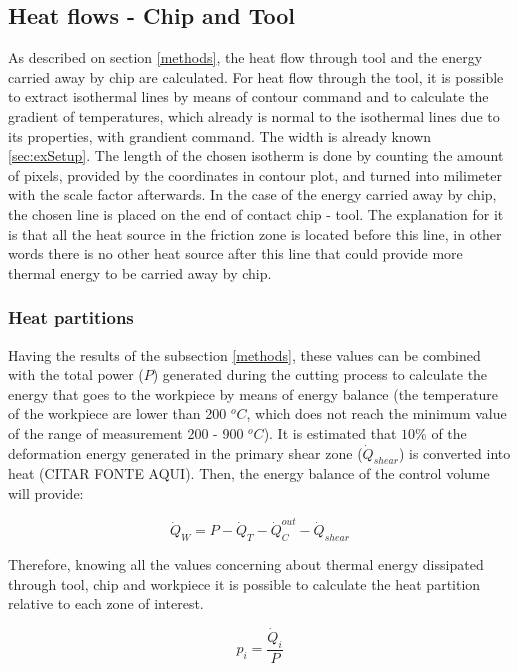 	\subsection{Heat flows - Chip and Tool}
	\label{heatflows}
	As described on section \ref{methods}, the heat flow through tool and the energy carried away by chip are calculated. For heat flow through the tool, it is possible to extract isothermal lines by means of contour command and to calculate the gradient of temperatures, which already is normal to the isothermal lines due to its properties, with grandient command. The width is already known \ref{sec:exSetup}. The length of the chosen isotherm is done by counting the amount of pixels, provided by the coordinates in contour plot, and turned into milimeter with the scale factor afterwards.
	In the case of the energy carried away by chip, the chosen line is placed on the end of contact chip - tool. The explanation for it is that all the heat source in the friction zone is located before this line, in other words there is no other heat source after this line that could provide more thermal energy to be carried away by chip.		

		\subsubsection{Heat partitions}
		Having the results of the subsection \ref{methods}, these values can be combined with the total power ($P$) generated during the cutting process to calculate the energy that goes to the workpiece by means of energy balance (the temperature of the workpiece are lower than 200 $^{o}C$, which does not reach the minimum value of the range of measurement 200 - 900 $^{o}C$).
		It is estimated that $10\%$ of the deformation energy generated in the primary shear zone ($\dot{Q}_{shear}$) is converted into heat (CITAR FONTE AQUI). Then, the energy balance of the control volume will provide:

		\begin{equation} 
		\label{eq_energybalance}
		\dot{Q}_{W} = P - \dot{Q}_{T} - \dot{Q}_{C}^{out} - \dot{Q}_{shear}
		\end{equation}

		Therefore, knowing all the values concerning about thermal energy dissipated through tool, chip and workpiece it is possible to calculate the heat partition relative to each zone of interest.

		\begin{equation} 
		\label{eq_heatpartition}
		p_{i} = \frac{\dot{Q}_{i}}{P}
		\end{equation}

